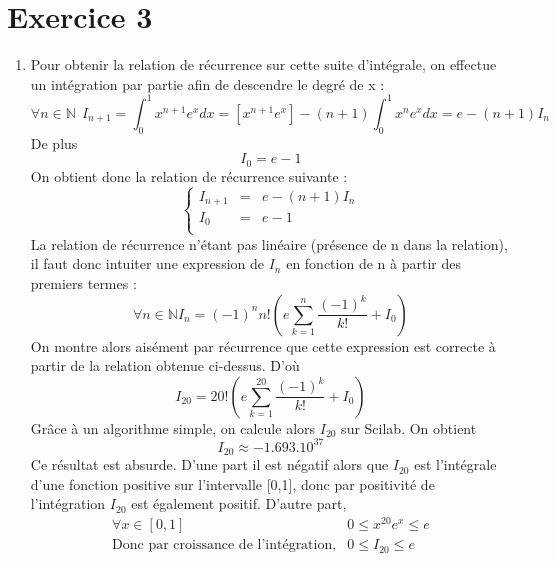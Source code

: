 \documentclass{article}
\begin{document}
\section{Exercice 3}
    \begin{enumerate}
        \item Pour obtenir la relation de récurrence sur cette suite d'intégrale, on effectue  un intégration par partie afin de descendre le degré de x : 
            \begin{displaymath}
                \forall n \in \mathbb{N}\ \ I_{n+1} = \int_{0}^1 x^{n+1}e^{x}dx
                                    = [x^{n+1}e^x]-(n+1)\int_{0}^1 x^{n}e^{x}dx
                                    = e - (n+1)I_n
            \end{displaymath}
            De plus
            \begin{displaymath}
                I_0 = e - 1
            \end{displaymath}
            On obtient donc la relation de récurrence suivante :
            \begin{displaymath}
                \left\{
                \begin{array}{rcr}
                    I_{n+1} & = & e - (n+1)I_n \\
                    I_0 & = & e - 1 \\
                \end{array}
                \right.
            \end{displaymath}
            La relation de récurrence n'étant pas linéaire (présence de n dans la relation), il faut donc intuiter une expression de $I_{n}$ en fonction de n à partir des premiers termes : 
            \begin{displaymath}
                \forall n \in \mathbb{N}   I_n = (-1)^{n}n!(e\sum_{k=1}^{n} \frac{(-1)^{k}}{k!} + I_0)
            \end{displaymath}
            On montre alors aisément par récurrence que cette expression est correcte à partir de la relation obtenue ci-dessus.
            D'où
            \begin{displaymath}
                I_{20} = 20!(e\sum_{k=1}^{20} \frac{(-1)^{k}}{k!} + I_0)
            \end{displaymath}
            Grâce à un algorithme simple, on calcule alors $I_{20}$ sur Scilab. On obtient
            \begin{displaymath}
                I_{20} \approx -1.693.10^{37}
            \end{displaymath}
            Ce résultat est absurde. D'une part il est négatif alors que $I_{20}$ est l'intégrale d'une fonction positive sur l'intervalle [0,1], donc par positivité de l'intégration $I_{20}$ est également positif. D'autre part,             
            \begin{eqnarray*}
                \forall x \in [0,1]  &0 \leq x^{20}e^{x} \leq e \\ 
                \text{Donc par croissance de l'intégration,} &0 \leq I_{20} \leq e
            \end{eqnarray*}


\end{enumerate}
\end{document}

